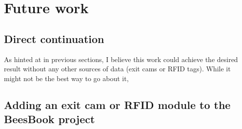 
\chapter{Future work}  %

\ifpdf
    \graphicspath{{Chapters/Chapter6/Figs/Raster/}{Chapters/Chapter6/Figs/PDF/}{Chapters/Chapter6/Figs/}}
\else
    \graphicspath{{Chapters/Chapter6/Figs/Vector/}{Chapters/Chapter6/Figs/}}
\fi


\section{Direct continuation}

As hinted at in previous sections, I believe this work could achieve the desired result without any other sources of data (exit cams or RFID tags). While it might not be the best way to go about it, 




\section{Adding an exit cam or RFID module to the BeesBook project}










